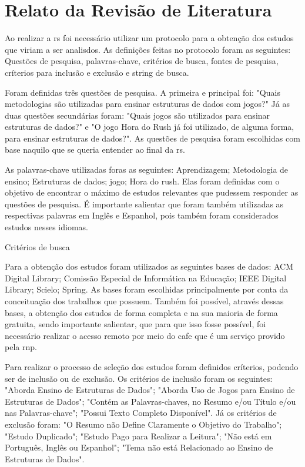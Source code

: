 \documentclass[12pt]{article}
\begin{document}
\section{Relato da Revisão de Literatura}

Ao realizar a \gls{rs} foi necessário utilizar um protocolo para a obtenção dos estudos que viriam a ser analisdos. As definições feitas no protocolo foram as seguintes: Questões de pesquisa, palavras-chave, critérios de busca, fontes de pesquisa, críterios para inclusão e exclusão e string de busca.

Foram definidas três questões de pesquisa. A primeira e principal foi: "Quais metodologias são utilizadas para ensinar estruturas de dados com jogos?" Já as duas questões secundárias foram: "Quais jogos são utilizados para ensinar estruturas de dados?" e "O jogo Hora do Rush já foi utilizado, de alguma forma, para ensinar estruturas de dados?". As questões de pesquisa foram escolhidas com base naquilo que se queria entender ao final da \gls{rs}.

As palavras-chave utilizadas foras as seguintes: Aprendizagem; Metodologia de ensino; Estruturas de dados; jogo; Hora do rush.
Elas foram definidas com o objetivo de encontrar o máximo de estudos relevantes que pudessem responder as questões de pesquisa. É importante salientar que foram também utilizadas as respectivas palavras em Inglês e Espanhol, pois também foram considerados estudos nesses idiomas.

Critérios de busca

Para a obtenção dos estudos foram utilizados as seguintes bases de dados: ACM Digital Library; Comissão Especial de Informática na Educação; IEEE Digital Library; Scielo; Spring.
As bases foram escolhidas principalmente por conta da conceituação dos trabalhos que possuem. Também foi possível, através dessas bases, a obtenção dos estudos de forma completa e na sua maioria de forma gratuita, sendo importante salientar, que para que isso fosse possível, foi necessário realizar o acesso remoto por meio do \gls{cafe} que é um serviço provido pela \gls{rnp}.

Para realizar o processo de seleção dos estudos foram definidos críterios, podendo ser de inclusão ou de exclusão. Os critérios de inclusão foram os seguintes: "Aborda Ensino de Estruturas de Dados"; "Aborda Uso de Jogos para Ensino de Estruturas de Dados"; "Contém as Palavras-chaves, no Resumo e/ou Título e/ou nas Palavras-chave"; "Possui Texto Completo Disponível". Já os critérios de exclusão foram: "O Resumo não Define Claramente o Objetivo do Trabalho"; "Estudo Duplicado"; "Estudo Pago para Realizar a Leitura"; "Não está em Português, Inglês ou Espanhol"; "Tema não está Relacionado ao Ensino de Estruturas de Dados".
\end{document}
